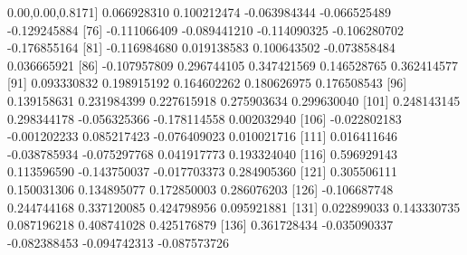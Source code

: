 \documentclass[
]{article}
\newenvironment{Shaded}{\begin{snugshade}}{\end{snugshade}}
\newcommand{\DecValTok}[1]{\textcolor[rgb]{0.00,0.00,0.81}{#1}}
\newcommand{\FloatTok}[1]{\textcolor[rgb]{0.00,0.00,0.81}{#1}}
\newcommand{\NormalTok}[1]{#1}
\newcommand{\SpecialCharTok}[1]{\textcolor[rgb]{0.00,0.00,0.00}{#1}}
\begin{document}
\begin{Shaded}
\begin{Highlighting}[]
\NormalTok{ [}\DecValTok{71}\NormalTok{]  }\FloatTok{0.066928310}  \FloatTok{0.100212474} \SpecialCharTok{{-}}\FloatTok{0.063984344} \SpecialCharTok{{-}}\FloatTok{0.066525489} \SpecialCharTok{{-}}\FloatTok{0.129245884}
\NormalTok{ [}\DecValTok{76}\NormalTok{] }\SpecialCharTok{{-}}\FloatTok{0.111066409} \SpecialCharTok{{-}}\FloatTok{0.089441210} \SpecialCharTok{{-}}\FloatTok{0.114090325} \SpecialCharTok{{-}}\FloatTok{0.106280702} \SpecialCharTok{{-}}\FloatTok{0.176855164}
\NormalTok{ [}\DecValTok{81}\NormalTok{] }\SpecialCharTok{{-}}\FloatTok{0.116984680}  \FloatTok{0.019138583}  \FloatTok{0.100643502} \SpecialCharTok{{-}}\FloatTok{0.073858484}  \FloatTok{0.036665921}
\NormalTok{ [}\DecValTok{86}\NormalTok{] }\SpecialCharTok{{-}}\FloatTok{0.107957809}  \FloatTok{0.296744105}  \FloatTok{0.347421569}  \FloatTok{0.146528765}  \FloatTok{0.362414577}
\NormalTok{ [}\DecValTok{91}\NormalTok{]  }\FloatTok{0.093330832}  \FloatTok{0.198915192}  \FloatTok{0.164602262}  \FloatTok{0.180626975}  \FloatTok{0.176508543}
\NormalTok{ [}\DecValTok{96}\NormalTok{]  }\FloatTok{0.139158631}  \FloatTok{0.231984399}  \FloatTok{0.227615918}  \FloatTok{0.275903634}  \FloatTok{0.299630040}
\NormalTok{[}\DecValTok{101}\NormalTok{]  }\FloatTok{0.248143145}  \FloatTok{0.298344178} \SpecialCharTok{{-}}\FloatTok{0.056325366} \SpecialCharTok{{-}}\FloatTok{0.178114558}  \FloatTok{0.002032940}
\NormalTok{[}\DecValTok{106}\NormalTok{] }\SpecialCharTok{{-}}\FloatTok{0.022802183} \SpecialCharTok{{-}}\FloatTok{0.001202233}  \FloatTok{0.085217423} \SpecialCharTok{{-}}\FloatTok{0.076409023}  \FloatTok{0.010021716}
\NormalTok{[}\DecValTok{111}\NormalTok{]  }\FloatTok{0.016411646} \SpecialCharTok{{-}}\FloatTok{0.038785934} \SpecialCharTok{{-}}\FloatTok{0.075297768}  \FloatTok{0.041917773}  \FloatTok{0.193324040}
\NormalTok{[}\DecValTok{116}\NormalTok{]  }\FloatTok{0.596929143}  \FloatTok{0.113596590} \SpecialCharTok{{-}}\FloatTok{0.143750037} \SpecialCharTok{{-}}\FloatTok{0.017703373}  \FloatTok{0.284905360}
\NormalTok{[}\DecValTok{121}\NormalTok{]  }\FloatTok{0.305506111}  \FloatTok{0.150031306}  \FloatTok{0.134895077}  \FloatTok{0.172850003}  \FloatTok{0.286076203}
\NormalTok{[}\DecValTok{126}\NormalTok{] }\SpecialCharTok{{-}}\FloatTok{0.106687748}  \FloatTok{0.244744168}  \FloatTok{0.337120085}  \FloatTok{0.424798956}  \FloatTok{0.095921881}
\NormalTok{[}\DecValTok{131}\NormalTok{]  }\FloatTok{0.022899033}  \FloatTok{0.143330735}  \FloatTok{0.087196218}  \FloatTok{0.408741028}  \FloatTok{0.425176879}
\NormalTok{[}\DecValTok{136}\NormalTok{]  }\FloatTok{0.361728434} \SpecialCharTok{{-}}\FloatTok{0.035090337} \SpecialCharTok{{-}}\FloatTok{0.082388453} \SpecialCharTok{{-}}\FloatTok{0.094742313} \SpecialCharTok{{-}}\FloatTok{0.087573726}

\end{Highlighting}
\end{Shaded}
\end{document}
